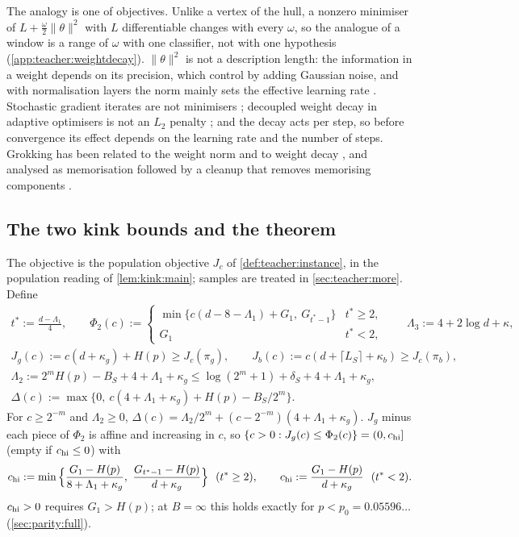 \begin{remark}[$\lambda=cn$ and weight decay]
The analogy is one of objectives. Unlike a vertex of the hull, a nonzero minimiser of $L+\frac\omega2\|\theta\|^2$ with $L$ differentiable changes with every $\omega$, so the analogue of a window is a range of $\omega$ with one classifier, not with one hypothesis (\cref{app:teacher:weightdecay}). $\|\theta\|^2$ is not a description length: the information in a weight depends on its precision, which \citet{hinton1993keeping} control by adding Gaussian noise, and with normalisation layers the norm mainly sets the effective learning rate \citep{vanlaarhoven2017l2}. Stochastic gradient iterates are not minimisers \citep{mandt2017stochastic}; decoupled weight decay in adaptive optimisers is not an $L_2$ penalty \citep{loshchilov2019decoupled,xie2024implicit}; and the decay acts per step, so before convergence its effect depends on the learning rate and the number of steps. Grokking \citep{power2022grokking,liu2022towards} has been related to the weight norm and to weight decay \citep{liu2023omnigrok}, and analysed as memorisation followed by a cleanup that removes memorising components \citep{nanda2023progress}.
\end{remark}

\subsection{The two kink bounds and the theorem}\label{sec:teacher:theorem}

The objective is the population objective $J_c$ of \cref{def:teacher:instance}, in the population reading of \cref{lem:kink:main}; samples are treated in \cref{sec:teacher:more}. Define
\begin{gather*}
t^*:=\tfrac{d-\Lambda_1}4,\qquad
\Phi_2(c):=\begin{cases}\min\{c(d-8-\Lambda_1)+G_1,\ G_{t^*-1}\}&t^*\ge2,\\ G_1&t^*<2,\end{cases}\qquad\Lambda_3:=4+2\log d+\kappa,\\
J_g(c):=c(d+\kappa_g)+H(p)\ge J_c(\pi_g),\qquad J_b(c):=c(d+\lceil L_S\rceil+\kappa_b)\ge J_c(\pi_b),\\
\Lambda_2:=2^mH(p)-B_S+4+\Lambda_1+\kappa_g\le\log(2^m+1)+\delta_S+4+\Lambda_1+\kappa_g,\\
\Delta(c):=\max\{0,\ c(4+\Lambda_1+\kappa_g)+H(p)-B_S/2^m\}.
\end{gather*}
For $c\ge2^{-m}$ and $\Lambda_2\ge0$, $\Delta(c)=\Lambda_2/2^m+(c-2^{-m})(4+\Lambda_1+\kappa_g)$. $J_g$ minus each piece of $\Phi_2$ is affine and increasing in $c$, so $\{c>0:J_g(c)\le\Phi_2(c)\}=(0,c_{\rm hi}]$ (empty if $c_{\rm hi}\le0$) with
\[
c_{\rm hi}:=\min\Big\{\frac{G_1-H(p)}{8+\Lambda_1+\kappa_g},\ \frac{G_{t^*-1}-H(p)}{d+\kappa_g}\Big\}\ \ (t^*\ge2),\qquad c_{\rm hi}:=\frac{G_1-H(p)}{d+\kappa_g}\ \ (t^*<2).
\]
$c_{\rm hi}>0$ requires $G_1>H(p)$; at $B=\infty$ this holds exactly for $p<p_0=0.05596\ldots$ (\cref{sec:parity:full}).

